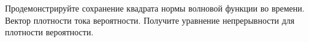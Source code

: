\documentclass[__main__.tex]{subfiles}
\begin{document}
Продемонстрируйте сохранение квадрата нормы волновой функции во времени. Вектор плотности тока вероятности. Получите уравнение непрерывности для плотности вероятности.\\ 

\end{document}
